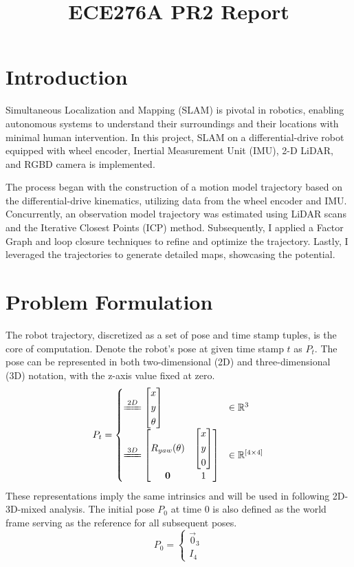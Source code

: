 \documentclass[conference]{IEEEtran}
\begin{document}
\title{ECE276A PR2 Report}

\author{
}

\maketitle


\section{Introduction}
Simultaneous Localization and Mapping (SLAM) is pivotal in robotics, 
enabling autonomous systems to understand their surroundings and their locations 
with minimal human intervention. 
In this project, SLAM on a differential-drive robot equipped with wheel encoder, 
Inertial Measurement Unit (IMU), 2-D LiDAR, and RGBD camera is implemented.

The process began with the construction of a motion model trajectory based on 
the differential-drive kinematics, 
utilizing data from the wheel encoder and IMU. 
Concurrently, an observation model trajectory was estimated using LiDAR scans 
and the Iterative Closest Points (ICP) method. 
Subsequently, I applied a Factor Graph and loop closure techniques to 
refine and optimize the trajectory. 
Lastly, I leveraged the trajectories to generate 
detailed maps, showcasing the potential.


\section{Problem Formulation}
The robot trajectory, discretized as a set of pose and time stamp tuples, 
is the core of computation.
Denote the robot's pose at given time stamp \(t\) as \(P_t\).
The pose can be represented in both two-dimensional (2D) and three-dimensional (3D) notation, 
with the z-axis value fixed at zero. 
$$
P_{t} = \begin{cases}
    \xlongequal{2D} \left[ \begin{gathered}x\\ y\\ \theta \end{gathered} \right] & \in \mathbb{R}^{3} \\ 
    \xlongequal{3D} \left[ \begin{matrix}R_{yaw}(\theta )&\left[ \begin{gathered}x\\ y\\0\end{gathered} \right]  \\ \mathbf{0}&1\end{matrix} \right] & \in \mathbb{R}^{[4\times 4]}
\end{cases} 
$$
These representations imply the same intrinsics 
and will be used in following 2D-3D-mixed analysis.
The initial pose $P_0$ at time 0 is also defined as the world frame
serving as the reference for all subsequent poses.
$$P_{0}=\begin{cases}\vec{0}_{3}\\ I_{4}\end{cases} $$
\end{document}
